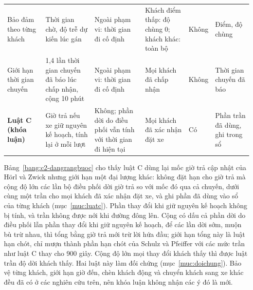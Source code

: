 \begin{table}[htbp]
\begin{tabular}{@{}p{2.6cm}p{2.7cm}p{2.9cm}p{2.3cm}p{1.8cm}p{2.6cm}@{}}
Bảo đảm theo từng khách~\cite{elmi2026} & Thời gian chờ, độ trễ dự kiến lúc gán & Ngoài phạm vi: thời gian đi cố
định & Khách điểm thấp: độ chùng 0; khách khác: toàn bộ & Không & Điểm, độ chùng\\
Giới hạn thời gian chuyến~\cite{laupichler2026} & 1,4 lần thời gian chuyến đã báo lúc chấp nhận, cộng 10 phút &
Ngoài phạm vi: thời gian đi cố định & Mọi khách đã chấp nhận & Không & Thời gian chuyến đã báo\\
\textbf{Luật C (khóa luận)} & Giờ trả nếu xe giữ nguyên kế hoạch, tính lại ở mỗi lượt & Không; phần dời do điều phối
vẫn tính với thời gian đi hiện tại & Mọi khách đã xác nhận đặt xe & Có & Phần trần đã dùng, ghi trong sổ\\
\bottomrule
\end{tabular}
\end{table}

Bảng~\ref{bang:c2-dangrangbuoc} cho thấy luật C dùng lại mốc giờ trả cập nhật của Hörl và Zwick nhưng giới hạn một
đại lượng khác: không đặt hạn cho giờ trả mà cộng độ lớn các lần bộ điều phối dời giờ trả so với mốc đó qua cả
chuyến, dưới cùng một trần cho mọi khách đã xác nhận đặt xe, và ghi phần đã dùng vào sổ của từng khách
(mục~\ref{muc:luatc}). Phần thay đổi khi giữ nguyên kế hoạch không bị tính, và trần không được nới khi đường đông lên.
Cộng có dấu cả phần dời do điều phối lẫn phần thay đổi khi giữ nguyên kế hoạch, để các lần dời sớm, muộn bù trừ nhau,
thì tổng bằng giờ trả mới trừ lời hứa đầu; giới hạn tổng này là luật hạn chót, chỉ mượn thành phần hạn chót của
Schulz và Pfeiffer với các mức trần như luật C thay cho 900 giây. Cộng độ lớn mọi thay đổi khách thấy thì được luật
trần độ dời khách thấy. Hai luật này làm đối chứng (mục~\ref{muc:doichung}). Bảo vệ từng khách, giới hạn giờ đến, chèn khách động và chuyển khách sang xe khác đều đã có
ở các nghiên cứu trên, nên khóa luận không nhận các ý đó là mới.

